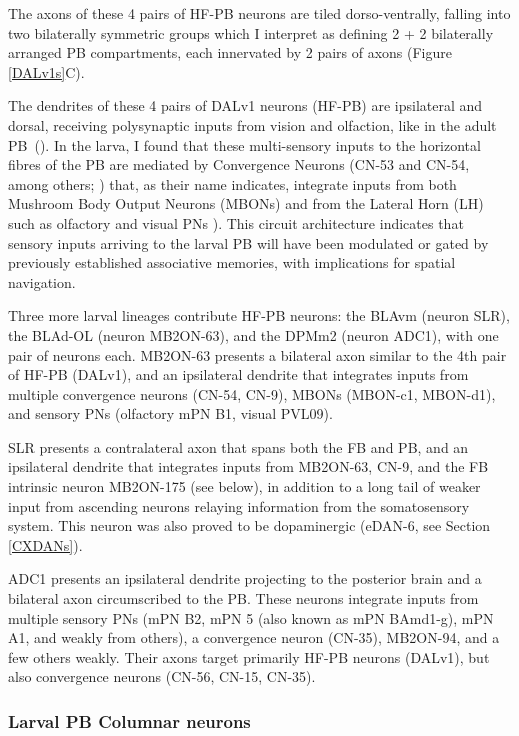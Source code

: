     The axons of these 4 pairs of HF-PB neurons are tiled dorso-ventrally, falling into two bilaterally symmetric groups which I interpret as defining 2 + 2 bilaterally arranged PB compartments, each innervated by 2 pairs of axons (Figure \ref{DALv1s}C). 

    The dendrites of these 4 pairs of DALv1 neurons (HF-PB) are ipsilateral and dorsal, receiving polysynaptic inputs from vision and olfaction, like in the adult PB~(\citep{hulse2021connectome}). In the larva, I found that these multi-sensory inputs to the horizontal fibres of the PB are mediated by Convergence Neurons (CN-53 and CN-54, among others; \citep{eschbach2021circuits}) that, as their name indicates, integrate inputs from both Mushroom Body Output Neurons (MBONs) and from the Lateral Horn (LH) such as olfactory and visual PNs \citep{eschbach2020recurrent}). This circuit architecture indicates that sensory inputs arriving to the larval PB will have been modulated or gated by previously established associative memories, with implications for spatial navigation.

    Three more larval lineages contribute HF-PB neurons: the BLAvm (neuron SLR), the BLAd-OL (neuron MB2ON-63), and the DPMm2 (neuron ADC1),  with one pair of neurons each. 
    MB2ON-63 presents a bilateral axon similar to the 4th pair of HF-PB (DALv1), and an ipsilateral dendrite that integrates inputs from multiple convergence neurons (CN-54, CN-9), MBONs (MBON-c1, MBON-d1), and sensory PNs (olfactory mPN B1, visual PVL09).

    SLR presents a contralateral axon that spans both the FB and PB, and an ipsilateral dendrite that integrates inputs from MB2ON-63, CN-9, and the FB intrinsic neuron MB2ON-175 (see below), in addition to a long tail of weaker input from ascending neurons relaying information from the somatosensory system. This neuron was also proved to be dopaminergic (eDAN-6, see Section \ref{CXDANs}). 

    ADC1 presents an ipsilateral dendrite projecting to the posterior brain and a bilateral axon circumscribed to the PB. These neurons integrate inputs from multiple sensory PNs (mPN B2, mPN 5 (also known as mPN BAmd1-g), mPN A1, and weakly from others), a convergence neuron (CN-35), MB2ON-94, and a few others weakly. Their axons target primarily HF-PB neurons (DALv1), but also convergence neurons  (CN-56, CN-15, CN-35).
 
        \subsubsection{Larval PB Columnar neurons}

